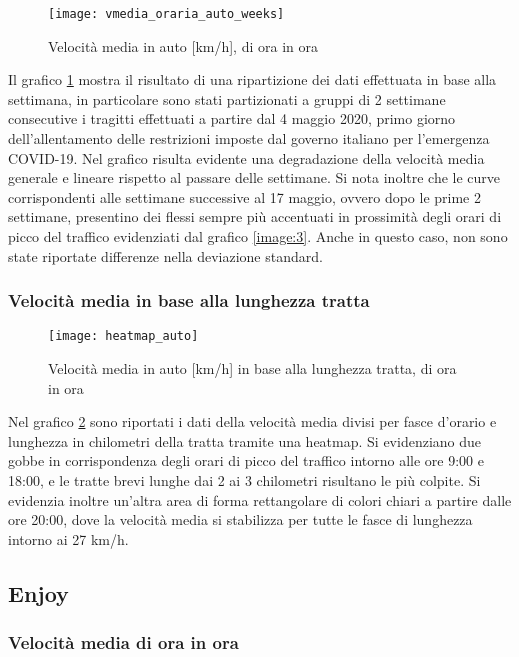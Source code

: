 \begin{figure}[H]
\texttt{[image: vmedia\_oraria\_auto\_weeks]}
\caption{Velocità media in auto [km/h], di ora in ora}
\label{image:5}
\end{figure}

Il grafico \ref{image:5} mostra il risultato di una ripartizione dei dati effettuata in base alla settimana, in particolare sono stati partizionati a gruppi di 2 settimane consecutive i tragitti effettuati a partire dal 4 maggio 2020, primo giorno dell'allentamento delle restrizioni imposte dal governo italiano per l'emergenza COVID-19\cite{dpcm26aprile}. Nel grafico risulta evidente una degradazione della velocità media generale e lineare rispetto al passare delle settimane. Si nota inoltre che le curve corrispondenti alle settimane successive al 17 maggio, ovvero dopo le prime 2 settimane, presentino dei flessi sempre più accentuati in prossimità degli orari di picco del traffico evidenziati dal grafico \ref{image:3}. Anche in questo caso, non sono state riportate differenze nella deviazione standard.

\subsubsection{Velocità media in base alla lunghezza tratta}

\begin{figure}[H]
\texttt{[image: heatmap\_auto]}
\caption{Velocità media in auto [km/h] in base alla lunghezza tratta, di ora in ora}
\label{image:6}
\end{figure}

Nel grafico \ref{image:6} sono riportati i dati della velocità media divisi per fasce d'orario e lunghezza in chilometri della tratta tramite una heatmap. Si evidenziano due gobbe in corrispondenza degli orari di picco del traffico intorno alle ore 9:00 e 18:00, e le tratte brevi lunghe dai 2 ai 3 chilometri risultano le più colpite. Si evidenzia inoltre un'altra area di forma rettangolare di colori chiari a partire dalle ore 20:00, dove la velocità media si stabilizza per tutte le fasce di lunghezza intorno ai 27 km/h.

\subsection{Enjoy}

\subsubsection{Velocità media di ora in ora}


